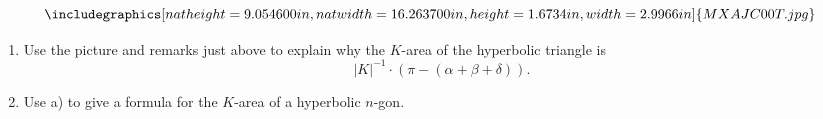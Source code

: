\documentclass{ximera}
\begin{document}
\[%
{\includegraphics[
natheight=9.054600in,
natwidth=16.263700in,
height=1.6734in,
width=2.9966in
]%
{MXAJC00T.jpg}%
}%
\]


\begin{exercise}\hfil
\begin{enumerate}
\item Use the picture and remarks just above to explain why the
$K$-area of the hyperbolic triangle is%
\[
\left\vert K\right\vert ^{-1}\cdot\left(  \pi-\left(
\alpha+\beta+\delta\right)  \right)  .
\]
\item Use a) to give a formula for the $K$-area of a hyperbolic $n$-gon.
\end{enumerate}
\end{exercise}
\end{document}
